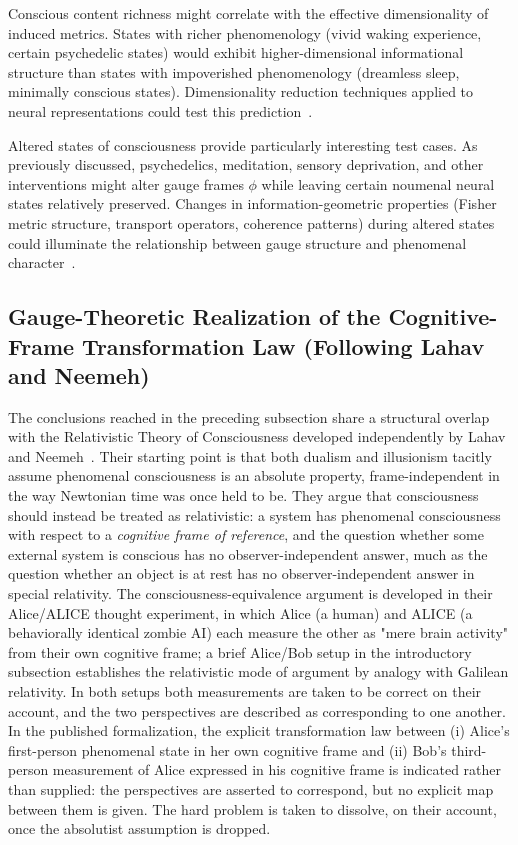 \documentclass[11pt]{article}
\begin{document}
Conscious content richness might correlate with the effective dimensionality of induced metrics. States with richer phenomenology (vivid waking experience, certain psychedelic states) would exhibit higher-dimensional informational structure than states with impoverished phenomenology (dreamless sleep, minimally conscious states). Dimensionality reduction techniques applied to neural representations could test this prediction~\cite{Gao2017, Shine2019}.

Altered states of consciousness provide particularly interesting test cases. As previously discussed, psychedelics, meditation, sensory deprivation, and other interventions might alter gauge frames $\phi$ while leaving certain noumenal neural states relatively preserved. Changes in information-geometric properties (Fisher metric structure, transport operators, coherence patterns) during altered states could illuminate the relationship between gauge structure and phenomenal character~\cite{Carhart-Harris2014, Milliere2018}.

\subsection{Gauge-Theoretic Realization of the Cognitive-Frame Transformation Law (Following Lahav and Neemeh)}
\label{sec:lahav_convergence}

The conclusions reached in the preceding subsection share a structural overlap with the Relativistic Theory of Consciousness developed independently by Lahav and Neemeh~\cite{LahavNeemeh2022, LahavNeemeh2025}. Their starting point is that both dualism and illusionism tacitly assume phenomenal consciousness is an absolute property, frame-independent in the way Newtonian time was once held to be. They argue that consciousness should instead be treated as relativistic: a system has phenomenal consciousness with respect to a \emph{cognitive frame of reference}, and the question whether some external system is conscious has no observer-independent answer, much as the question whether an object is at rest has no observer-independent answer in special relativity. The consciousness-equivalence argument is developed in their Alice/ALICE thought experiment, in which Alice (a human) and ALICE (a behaviorally identical zombie AI) each measure the other as "mere brain activity" from their own cognitive frame; a brief Alice/Bob setup in the introductory subsection establishes the relativistic mode of argument by analogy with Galilean relativity. In both setups both measurements are taken to be correct on their account, and the two perspectives are described as corresponding to one another. In the published formalization, the explicit transformation law between (i) Alice's first-person phenomenal state in her own cognitive frame and (ii) Bob's third-person measurement of Alice expressed in his cognitive frame is indicated rather than supplied: the perspectives are asserted to correspond, but no explicit map between them is given. The hard problem is taken to dissolve, on their account, once the absolutist assumption is dropped.
\end{document}

